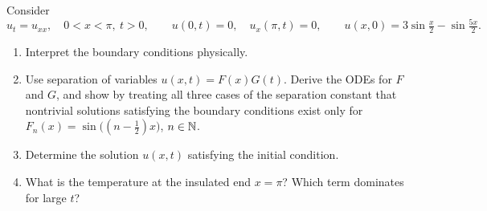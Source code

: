 Consider
\[
u_t=u_{xx},\quad 0<x<\pi,\ t>0,\qquad u(0,t)=0,\quad u_x(\pi,t)=0,\qquad u(x,0)=3\sin\tfrac x2-\sin\tfrac{5x}2.
\]
\begin{enumerate}
\item Interpret the boundary conditions physically.
\item Use separation of variables $u(x,t)=F(x)G(t)$. Derive the ODEs for $F$ and $G$, and show by treating all three cases of the separation constant that nontrivial solutions satisfying the boundary conditions exist only for $F_n(x)=\sin\big((n-\frac12)x\big)$, $n\in\mathbb{N}$.
\item Determine the solution $u(x,t)$ satisfying the initial condition.
\item What is the temperature at the insulated end $x=\pi$? Which term dominates for large $t$?
\end{enumerate}

